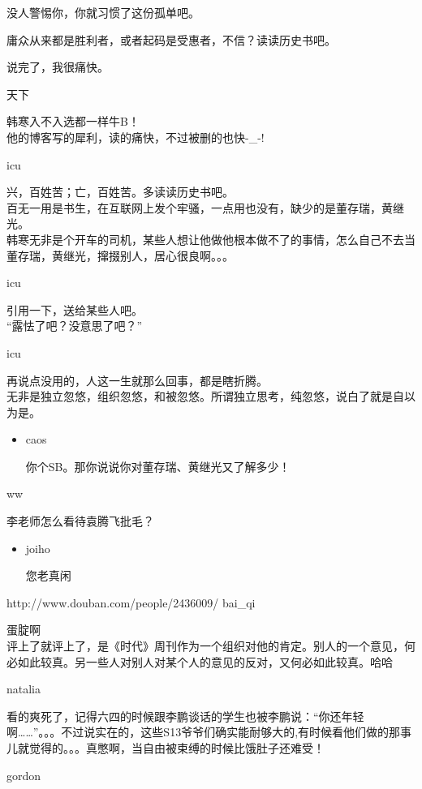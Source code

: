 没人警惕你，你就习惯了这份孤单吧。

庸众从来都是胜利者，或者起码是受惠者，不信？读读历史书吧。

说完了，我很痛快。

天下

韩寒入不入选都一样牛B！\\ 他的博客写的犀利，读的痛快，不过被删的也快-\_-!

icu

兴，百姓苦；亡，百姓苦。多读读历史书吧。\\
百无一用是书生，在互联网上发个牢骚，一点用也没有，缺少的是董存瑞，黄继光。\\
韩寒无非是个开车的司机，某些人想让他做他根本做不了的事情，怎么自己不去当董存瑞，黄继光，撺掇别人，居心很良啊。。。

icu

引用一下，送给某些人吧。\\ ``露怯了吧？没意思了吧？''

icu

再说点没用的，人这一生就那么回事，都是瞎折腾。\\
无非是独立忽悠，组织忽悠，和被忽悠。所谓独立思考，纯忽悠，说白了就是自以为是。

\begin{itemize}[<+->]
\item
  caos

  你个SB。那你说说你对董存瑞、黄继光又了解多少！
\end{itemize}

ww

李老师怎么看待袁腾飞批毛？

\begin{itemize}[<+->]
\item
  joiho

  您老真闲
\end{itemize}

http://www.douban.com/people/2436009/ bai\_qi

蛋腚啊\\
评上了就评上了，是《时代》周刊作为一个组织对他的肯定。别人的一个意见，何必如此较真。另一些人对别人对某个人的意见的反对，又何必如此较真。哈哈

natalia

看的爽死了，记得六四的时候跟李鹏谈话的学生也被李鹏说：``你还年轻啊\ldots{}\ldots{}''。。。不过说实在的，这些S13爷爷们确实能耐够大的,有时候看他们做的那事儿就觉得的。。。真憋啊，当自由被束缚的时候比饿肚子还难受！

gordon

